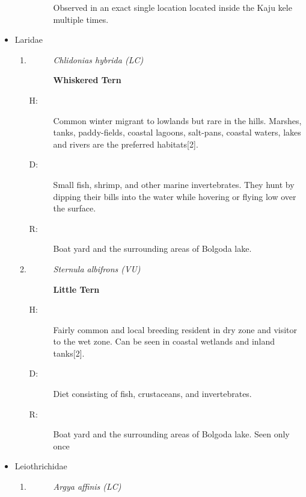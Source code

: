 \begin{itemize}
\begin{enumerate}
\begin{description}
Observed in an exact single location located inside the Kaju kele multiple times.%
\end{description}%
\end{enumerate}%
\newpage
\item%
Laridae%
\begin{enumerate}%
\item%
\begin{description}%
\item[]%
\textit{Chlidonias hybrida (LC)}%
\item[]%
\textbf{Whiskered Tern}%
\end{description}%
\begin{description}%
\item[H: ]%
Common winter migrant to lowlands but rare in the hills. Marshes, tanks, paddy-fields, coastal lagoons, salt{-}pans, coastal waters, lakes and rivers are the preferred habitats{[}2{]}.%
\item[D: ]%
Small fish, shrimp, and other marine invertebrates. They hunt by dipping their bills into the water while hovering or flying low over the surface.%
\item[R: ]%
Boat yard and the surrounding areas of Bolgoda lake.%
\end{description}%
\item%
\begin{description}%
\item[]%
\textit{Sternula albifrons (VU)}%
\item[]%
\textbf{Little Tern}%
\end{description}%
\begin{description}%
\item[H: ]%
Fairly common and local breeding resident in dry zone and visitor to the wet zone. Can be seen in coastal wetlands and inland tanks{[}2{]}.%
\item[D: ]%
Diet consisting of fish, crustaceans, and invertebrates.%
\item[R: ]%
Boat yard and the surrounding areas of Bolgoda lake. Seen only once%
\end{description}%
\end{enumerate}%
\item%
Leiothrichidae%
\begin{enumerate}%
\item%
\begin{description}%
\item[]%
\textit{Argya affinis (LC)}%
\item[]%

\end{description}
\end{enumerate}
\end{itemize}
